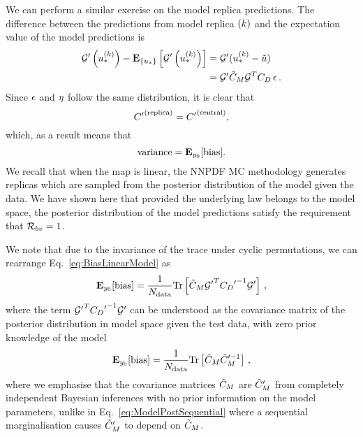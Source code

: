 We can perform a similar exercise on the model replica predictions. The
difference between the predictions from model replica $(k)$ and the
expectation value of the model predictions is
\begin{equation}
    \begin{split}
        {{\mathcal{G}}^{\prime}}\left(u_*^{(k)}\right) -
        \mathbf{E}_{\{ u_* \}} \left[ {{\mathcal{G}}^{\prime}}\left(u_*^{(k)}\right) \right] &=
        {{\mathcal{G}}^{\prime}} (u_*^{(k)} - \tilde{u}) \\
        &= {{\mathcal{G}}^{\prime}} \tilde{C}_M \mathcal{G}^T C_{D} \, \epsilon \, .
    \end{split}
\end{equation}
Since $\epsilon$ and $\eta$ follow the same distribution, it is clear that
\begin{equation}
    {{C}^{\prime}}^{(\rm replica)} = {{C}^{\prime}}^{(\rm central)},
\end{equation}
which, as a result means that
\begin{equation}
    {\rm variance} = \mathbf{E}_{y_0}[{\rm bias}].
\end{equation}
We recall that when the map is linear, the NNPDF MC methodology generates
replicas which are sampled from the posterior distribution of the model given
the data. We have shown here that provided the underlying law belongs to the
model space, the posterior distribution of the model predictions satisfy the
requirement that $\mathcal{R}_{bv} = 1$.

We note that due to the invariance of the trace under cyclic permutations, we
can rearrange Eq.~\ref{eq:BiasLinearModel} as
\begin{equation}
    \mathbf{E}_{y_0}[{\rm bias}] = \frac{1}{N_{\rm data}}
    {\rm Tr} \left[
        \tilde{C}_M
        {{\mathcal{G}}^{\prime}}^T {{C_{D}}^{\prime}}^{-1} {{\mathcal{G}}^{\prime}}
    \right] \, ,
\end{equation}
where the term ${{\mathcal{G}}^{\prime}}^T {{C_{D}}^{\prime}}^{-1}
{{\mathcal{G}}^{\prime}}$ can be understood as the covariance matrix of the posterior
distribution in model space given the test data, with zero prior knowledge of
the model \viz
\begin{equation}\label{eq:BiasTraceModelPost}
    \mathbf{E}_{y_0}[{\rm bias}] = \frac{1}{N_{\rm data}}
    {\rm Tr} \left[ \tilde{C}_M {\tilde{C}_M}^{ \prime -1} \right] \, ,
\end{equation}
where we emphasise that the covariance matrices $\tilde{C}_M$ are
${{\tilde{C}_M}^{\prime}}$ from completely independent Bayesian inferences
with no prior information on the model parameters, unlike in
Eq.~\ref{eq:ModelPostSequential} where a sequential marginalisation causes
${{\tilde{C}_M}^{\prime}}$ to depend on $\tilde{C}_M$.

